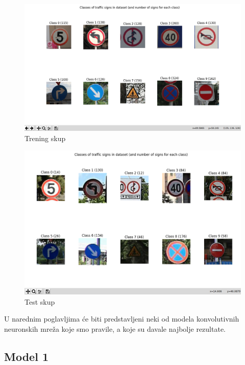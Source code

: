 \documentclass[a4paper]{article}
\begin{document}
\begin{figure}[h!]
\begin{center}
\includegraphics[scale=0.25]{trening_skup.png}
\end{center}
\caption{Trening skup}
\label{fig:trening_skup}
\end{figure}

\begin{figure}[h!]
\begin{center}
\includegraphics[scale=0.25]{test_skup.png}
\end{center}
\caption{Test skup}
\label{fig:test_skup}
\end{figure}

U narednim poglavljima će biti predstavljeni neki od modela konvolutivnih neuronskih mreža koje smo pravile, a koje su davale najbolje rezultate.

\subsection{Model 1}
\label{sec:model_1}
\end{document}
